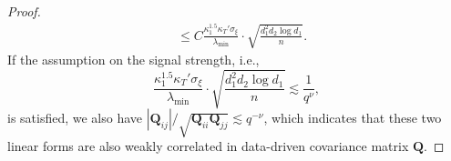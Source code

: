 \documentclass[12pt]{article}
\newcommand{\abs}[1]{\left\lvert#1\right\rvert}
\theoremstyle{plain}
\begin{document}
\begin{proof}
\begin{equation*}
\begin{aligned}
    &\le  C\frac{\kappa_1^{1.5} \kappa_T'  \sigma_{\xi} }{ \lambda_{\min}  }\cdot \sqrt{\frac{ d_1^2 d_2 \log d_1}{n}}.
\end{aligned}
\end{equation*}
If the assumption on the signal strength, i.e.,
\begin{equation*}
     \frac{\kappa_1^{1.5} \kappa_T'  \sigma_{\xi} }{ \lambda_{\min}  }\cdot \sqrt{\frac{ d_1^2 d_2 \log d_1}{n}} \lesssim \frac{1}{q^{\nu}},
\end{equation*}
is satisfied, we also have $ { \abs{\mathbf{Q}_{ij}} }/{\sqrt{\mathbf{Q}_{ii}\mathbf{Q}_{jj}}}\lesssim q^{-\nu} $, which indicates that these two linear forms are also weakly correlated in data-driven covariance matrix $\mathbf{Q}$.
\end{proof}
\end{document}
